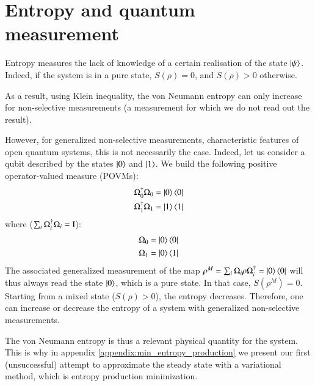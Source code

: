 \appendix

%
%



%
%

\section{Entropy and quantum measurement}
\label{appendix:entropy_measurement}

Entropy measures the lack of knowledge of a certain realisation of the state $\ket{\psi}$. Indeed, if the system is in a pure state, $S(\rho) = 0$, and $S(\rho) > 0$ otherwise. 

As a result, using Klein inequality, the von Neumann entropy can only increase for non-selective measurements (a measurement for which we do not read out the result).

However, for generalized non-selective measurements, characteristic features of open quantum systems, this is not necessarily the case. 
Indeed, let us consider a qubit described by the states $\ket{0}$ and $\ket{1}$. We build the following positive operator-valued measure (POVMs): 
\begin{align}
    \Omega_0^\dag \Omega_0 = \ket{0} \bra{0} \\ 
    \Omega_1^\dag \Omega_1 = \ket{1} \bra{1}  
\end{align}
where ($\sum_i \Omega_i^\dag \Omega_i = {\rm I}$):
\begin{align}
    \Omega_0 = \ket{0}\bra{0} \\
    \Omega_1 = \ket{0}\bra{1}
\end{align}
The associated generalized measurement of the map $\rho^M = \sum_i \Omega_i \rho \Omega_i^\dag = \ket{0}\bra{0} $ will thus always read the state $\ket{0}$, which is a pure state. In that case, $S(\rho^M) = 0$. Starting from a mixed state ($S(\rho) > 0$), the entropy decreases. Therefore, one can increase or decrease the entropy of a system with generalized non-selective measurements. 

The von Neumann entropy is thus a relevant physical quantity for the system. This is why in appendix \ref{appendix:min_entropy_production} we present our first (unsuccessful) attempt to approximate the steady state with a variational method, which is entropy production minimization.

